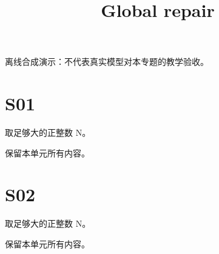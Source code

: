 \documentclass[UTF8,fontset=fandol,11pt]{ctexart}
\title{Global repair}
\date{}
\begin{document}
\maketitle
\par\noindent 离线合成演示：不代表真实模型对本专题的教学验收。\par
\section{S01}\label{sec:S01}
取足够大的正整数 N。\par
保留本单元所有内容。\par
\section{S02}\label{sec:S02}
取足够大的正整数 N。\par
保留本单元所有内容。\par
\end{document}
